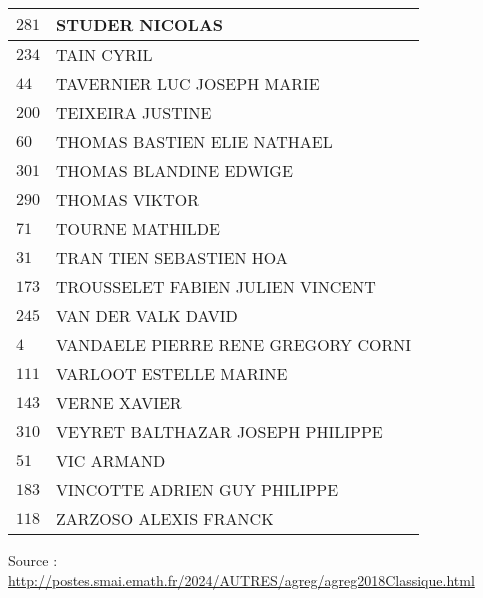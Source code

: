 \begin{xltabular}{\linewidth}{|l|X|}
    \hline
    $281$ & STUDER NICOLAS \\
    \hline
    $234$ & TAIN CYRIL \\
    \hline
    $44$ & TAVERNIER LUC JOSEPH MARIE \\
    \hline
    $200$ & TEIXEIRA JUSTINE \\
    \hline
    $60$ & THOMAS BASTIEN ELIE NATHAEL \\
    \hline
    $301$ & THOMAS BLANDINE EDWIGE \\
    \hline
    $290$ & THOMAS VIKTOR \\
    \hline
    $71$ & TOURNE MATHILDE \\
    \hline
    $31$ & TRAN TIEN SEBASTIEN HOA \\
    \hline
    $173$ & TROUSSELET FABIEN JULIEN VINCENT \\
    \hline
    $245$ & VAN DER VALK DAVID \\
    \hline
    $4$ & VANDAELE PIERRE RENE GREGORY CORNI \\
    \hline
    $111$ & VARLOOT ESTELLE MARINE \\
    \hline
    $143$ & VERNE XAVIER \\
    \hline
    $310$ & VEYRET BALTHAZAR JOSEPH PHILIPPE \\
    \hline
    $51$ & VIC ARMAND \\
    \hline
    $183$ & VINCOTTE ADRIEN GUY PHILIPPE \\
    \hline
    $118$ & ZARZOSO ALEXIS FRANCK \\
    \hline
  \end{xltabular}

  \begin{flushright}
    {\tiny Source : \url{http://postes.smai.emath.fr/2024/AUTRES/agreg/agreg2018Classique.html}}
  \end{flushright}

